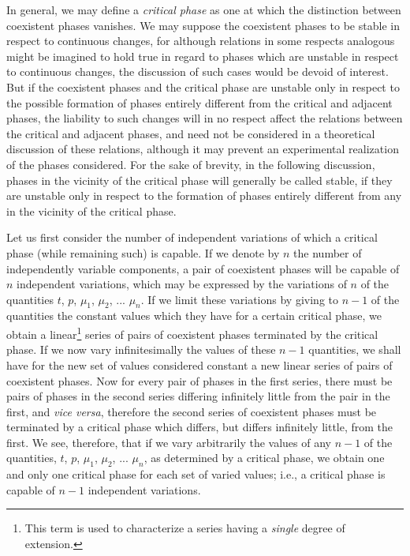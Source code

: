 \documentclass[12pt]{memoir}
\begin{document}
In general, we may define a \textit{critical phase} as one at which the distinction between coexistent phases vanishes. We may suppose the coexistent phases to be stable in respect to continuous changes, for although relations in some respects analogous might be imagined to hold true in regard to phases which are unstable in respect to continuous changes, the discussion of such cases would be devoid of interest. But if the coexistent phases and the critical phase are unstable only in respect to the possible formation of phases entirely different from the critical and adjacent phases, the liability to such changes will in no respect affect the relations between the critical and adjacent phases, and need not be considered in a theoretical discussion of these relations, although it may prevent an experimental realization of the phases considered. For the sake of brevity, in the following discussion, phases in the vicinity of the critical phase will generally be called stable, if they are unstable only in respect to the formation of phases entirely different from any in the vicinity of the critical phase.

Let us first consider the number of independent variations of which a critical phase (while remaining such) is capable. If we denote by $n$ the number of independently variable components, a pair of coexistent phases will be capable of $n$ independent variations, which may be expressed by the variations of $n$ of the quantities $t$, $p$, $\mu_1$, $\mu_2$, ... $\mu_n$. If we limit these variations by giving to $n -1$ of the quantities the constant values which they have for a certain critical phase, we obtain a linear\footnote{This term is used to characterize a series having a \textit{single} degree of extension.} series of pairs of coexistent phases terminated by the critical phase. If we now vary infinitesimally the values of these $n -1$ quantities, we shall have for the new set of values considered constant a new linear series of pairs of coexistent phases. Now for every pair of phases in the first series, there must be pairs of phases in the second series differing infinitely little from the pair in the first, and \textit{vice versa}, therefore the second series of coexistent phases must be terminated by a critical phase which differs, but differs infinitely little, from the first. We see, therefore, that if we vary arbitrarily the values of any $n -1$ of the quantities, $t$, $p$, $\mu_1$, $\mu_2$, ... $\mu_n$, as determined by a critical phase, we obtain one and only one critical phase for each set of varied values; i.e., a critical phase is capable of $n -1$ independent variations.
\end{document}
